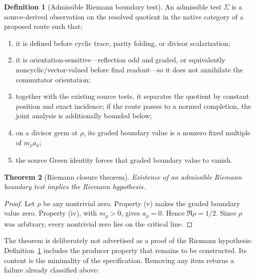 \documentclass[11pt]{article}
\newtheorem{theorem}{Theorem}[section]
\theoremstyle{definition}
\newtheorem{definition}[theorem]{Definition}
\theoremstyle{remark}
\begin{document}
\begin{definition}[Admissible Riemann boundary test]
\label{def:admissible-test}
An admissible test \(\Sigma\) is a source-derived observation on the resolved
quotient in the native category of a proposed route such that:
\begin{enumerate}[label=\textup{(\roman*)},leftmargin=2.2em]
\item it is defined before cyclic trace, parity folding, or divisor
      scalarization;
\item it is orientation-sensitive---reflection odd and graded, or
      equivalently noncyclic/vector-valued before final readout---so it does
      not annihilate the commutator orientation;
\item together with the existing source tests, it separates the quotient by
      constant position and exact incidence; if the route passes to a normed
      completion, the joint analysis is additionally bounded below;
\item on a divisor germ at \(\rho\), its graded boundary value is a nonzero
      fixed multiple of \(m_\rho a_\rho\);
\item the source Green identity forces that graded boundary value to vanish.
\end{enumerate}
\end{definition}

\par\medskip

\begin{theorem}[Riemann closure theorem]
\label{thm:riemann-closure}
Existence of an admissible Riemann boundary test implies the Riemann
hypothesis.
\end{theorem}

\begin{proof}
Let \(\rho\) be any nontrivial zero.  Property (v) makes the graded boundary
value zero.  Property (iv), with \(m_\rho>0\), gives
\(a_\rho=0\).  Hence \(\Re\rho=1/2\).  Since \(\rho\) was arbitrary, every
nontrivial zero lies on the critical line.
\end{proof}

The theorem is deliberately not advertised as a proof of the Riemann
hypothesis: Definition~\ref{def:admissible-test} includes the producer
property that remains to be constructed.  Its content is the minimality of
the specification.  Removing any item returns a failure already classified
above:
\end{document}
